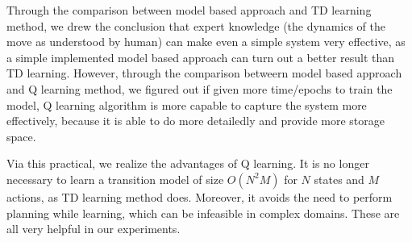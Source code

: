 \documentclass[submit]{harvardml}
\begin{document}
Through the comparison between model based approach and TD learning method, we drew the conclusion that expert knowledge (the dynamics of the move as understood by human) can make even a simple system very effective, as a simple implemented model based approach can turn out a better result than TD learning. However, through the comparison betweern model based approach and Q learning method, we figured out if given more time/epochs to train the model, Q learning algorithm is more capable to capture the system more effectively, because it is able to do more detailedly and provide more storage space.

Via this practical, we realize the advantages of Q learning. It is no longer necessary to learn a transition model of size $O(N^2M)$ for $N$ states and $M$ actions, as TD learning method does. Moreover, it avoids the need to perform planning while learning, which can be infeasible in complex domains. These are all very helpful in our experiments. 
\end{document}
